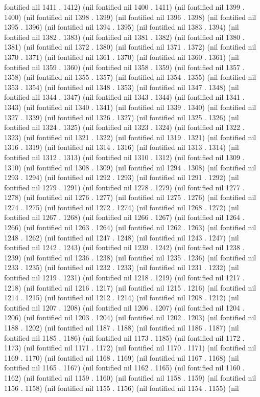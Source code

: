 fontified nil 1411 . 1412) (nil fontified nil 1400 . 1411) (nil fontified nil 1399 . 1400) (nil fontified nil 1398 . 1399) (nil fontified nil 1396 . 1398) (nil fontified nil 1395 . 1396) (nil fontified nil 1394 . 1395) (nil fontified nil 1383 . 1394) (nil fontified nil 1382 . 1383) (nil fontified nil 1381 . 1382) (nil fontified nil 1380 . 1381) (nil fontified nil 1372 . 1380) (nil fontified nil 1371 . 1372) (nil fontified nil 1370 . 1371) (nil fontified nil 1361 . 1370) (nil fontified nil 1360 . 1361) (nil fontified nil 1359 . 1360) (nil fontified nil 1358 . 1359) (nil fontified nil 1357 . 1358) (nil fontified nil 1355 . 1357) (nil fontified nil 1354 . 1355) (nil fontified nil 1353 . 1354) (nil fontified nil 1348 . 1353) (nil fontified nil 1347 . 1348) (nil fontified nil 1344 . 1347) (nil fontified nil 1343 . 1344) (nil fontified nil 1341 . 1343) (nil fontified nil 1340 . 1341) (nil fontified nil 1339 . 1340) (nil fontified nil 1327 . 1339) (nil fontified nil 1326 . 1327) (nil fontified nil 1325 . 1326) (nil fontified nil 1324 . 1325) (nil fontified nil 1323 . 1324) (nil fontified nil 1322 . 1323) (nil fontified nil 1321 . 1322) (nil fontified nil 1319 . 1321) (nil fontified nil 1316 . 1319) (nil fontified nil 1314 . 1316) (nil fontified nil 1313 . 1314) (nil fontified nil 1312 . 1313) (nil fontified nil 1310 . 1312) (nil fontified nil 1309 . 1310) (nil fontified nil 1308 . 1309) (nil fontified nil 1294 . 1308) (nil fontified nil 1293 . 1294) (nil fontified nil 1292 . 1293) (nil fontified nil 1291 . 1292) (nil fontified nil 1279 . 1291) (nil fontified nil 1278 . 1279) (nil fontified nil 1277 . 1278) (nil fontified nil 1276 . 1277) (nil fontified nil 1275 . 1276) (nil fontified nil 1274 . 1275) (nil fontified nil 1272 . 1274) (nil fontified nil 1268 . 1272) (nil fontified nil 1267 . 1268) (nil fontified nil 1266 . 1267) (nil fontified nil 1264 . 1266) (nil fontified nil 1263 . 1264) (nil fontified nil 1262 . 1263) (nil fontified nil 1248 . 1262) (nil fontified nil 1247 . 1248) (nil fontified nil 1243 . 1247) (nil fontified nil 1242 . 1243) (nil fontified nil 1239 . 1242) (nil fontified nil 1238 . 1239) (nil fontified nil 1236 . 1238) (nil fontified nil 1235 . 1236) (nil fontified nil 1233 . 1235) (nil fontified nil 1232 . 1233) (nil fontified nil 1231 . 1232) (nil fontified nil 1219 . 1231) (nil fontified nil 1218 . 1219) (nil fontified nil 1217 . 1218) (nil fontified nil 1216 . 1217) (nil fontified nil 1215 . 1216) (nil fontified nil 1214 . 1215) (nil fontified nil 1212 . 1214) (nil fontified nil 1208 . 1212) (nil fontified nil 1207 . 1208) (nil fontified nil 1206 . 1207) (nil fontified nil 1204 . 1206) (nil fontified nil 1203 . 1204) (nil fontified nil 1202 . 1203) (nil fontified nil 1188 . 1202) (nil fontified nil 1187 . 1188) (nil fontified nil 1186 . 1187) (nil fontified nil 1185 . 1186) (nil fontified nil 1173 . 1185) (nil fontified nil 1172 . 1173) (nil fontified nil 1171 . 1172) (nil fontified nil 1170 . 1171) (nil fontified nil 1169 . 1170) (nil fontified nil 1168 . 1169) (nil fontified nil 1167 . 1168) (nil fontified nil 1165 . 1167) (nil fontified nil 1162 . 1165) (nil fontified nil 1160 . 1162) (nil fontified nil 1159 . 1160) (nil fontified nil 1158 . 1159) (nil fontified nil 1156 . 1158) (nil fontified nil 1155 . 1156) (nil fontified nil 1154 . 1155) (nil 
